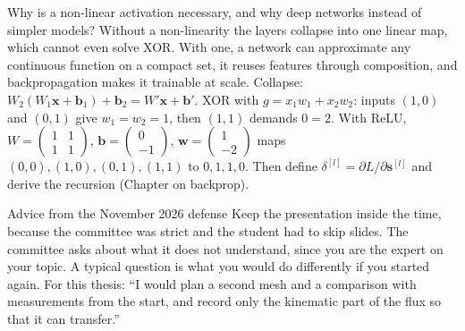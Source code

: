 \begin{qabox}[Hoedt]{\asked Why is a non-linear activation necessary, and why deep networks instead of simpler models?}
\ans Without a non-linearity the layers collapse into one linear map, which cannot even solve XOR. With
one, a network can approximate any continuous function on a compact set, it reuses features through
composition, and backpropagation makes it trainable at scale.
\formula Collapse: $W_2(W_1\mathbf x+\mathbf b_1)+\mathbf b_2=W'\mathbf x+\mathbf b'$. XOR with $g=x_1w_1+x_2w_2$: inputs $(1,0)$ and $(0,1)$ give
$w_1=w_2=1$, then $(1,1)$ demands $0=2$. With ReLU, $W=\begin{pmatrix}1&1\\1&1\end{pmatrix}$, $\mathbf b=\begin{pmatrix}0\\-1\end{pmatrix}$,
$\mathbf w=\begin{pmatrix}1\\-2\end{pmatrix}$ maps $(0,0),(1,0),(0,1),(1,1)$ to $0,1,1,0$.
\follow Then define $\delta^{[l]}=\partial L/\partial\mathbf s^{[l]}$ and derive the recursion (Chapter on backprop).
\end{qabox}

\begin{qabox}[Defense]{\asked Advice from the November 2026 defense}
\ans Keep the presentation inside the time, because the committee was strict and the student had to skip
slides. The committee asks about what it does not understand, since you are the expert on your topic. A
typical question is what you would do differently if you started again.
\follow For this thesis: ``I would plan a second mesh and a comparison with measurements from the start,
and record only the kinematic part of the flux so that it can transfer.''
\end{qabox}
